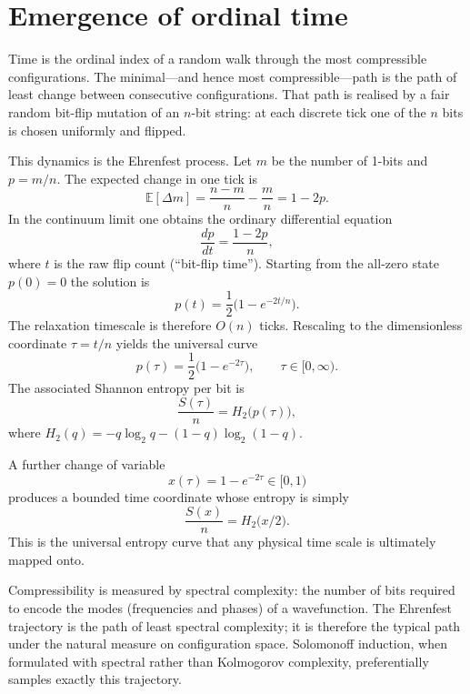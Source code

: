 \documentclass[11pt]{article}
\begin{document}
\section{Emergence of ordinal time}

Time is the ordinal index of a random walk through the most 
compressible configurations. The minimal---and hence most 
compressible---path is the path of least change between consecutive 
configurations. That path is realised by a fair random bit-flip 
mutation of an \(n\)-bit string: at each discrete tick one of the 
\(n\) bits is chosen uniformly and flipped.

This dynamics is the Ehrenfest process. Let \(m\) be the number of 
1-bits and \(p=m/n\). The expected change in one tick is
\begin{equation}
  \mathbb{E}[\Delta m]=\frac{n-m}{n}-\frac{m}{n}=1-2p.
\end{equation}
In the continuum limit one obtains the ordinary differential equation
\begin{equation}
  \frac{dp}{dt}=\frac{1-2p}{n},
\end{equation}
where \(t\) is the raw flip count (``bit-flip time''). Starting from 
the all-zero state \(p(0)=0\) the solution is
\begin{equation}
  p(t)=\frac12\bigl(1-e^{-2t/n}\bigr).
\end{equation}
The relaxation timescale is therefore \(O(n)\) ticks. Rescaling to 
the dimensionless coordinate \(\tau=t/n\) yields the universal curve
\begin{equation}
  p(\tau)=\frac12\bigl(1-e^{-2\tau}\bigr),\qquad\tau\in[0,\infty).
\end{equation}
The associated Shannon entropy per bit is
\begin{equation}
  \frac{S(\tau)}{n}=H_2\bigl(p(\tau)\bigr),
\end{equation}
where \(H_2(q)=-q\log_2 q-(1-q)\log_2(1-q)\).

A further change of variable
\begin{equation}
  x(\tau)=1-e^{-2\tau}\in[0,1)
\end{equation}
produces a bounded time coordinate whose entropy is simply
\begin{equation}
  \frac{S(x)}{n}=H_2\bigl(x/2\bigr).
\end{equation}
This is the universal entropy curve that any physical time scale is 
ultimately mapped onto.

Compressibility is measured by spectral complexity: the number of 
bits required to encode the modes (frequencies and phases) of a 
wavefunction. The Ehrenfest trajectory is the path of least spectral 
complexity; it is therefore the typical path under the natural measure 
on configuration space. Solomonoff induction, when formulated with 
spectral rather than Kolmogorov complexity, preferentially samples 
exactly this trajectory.
\end{document}
